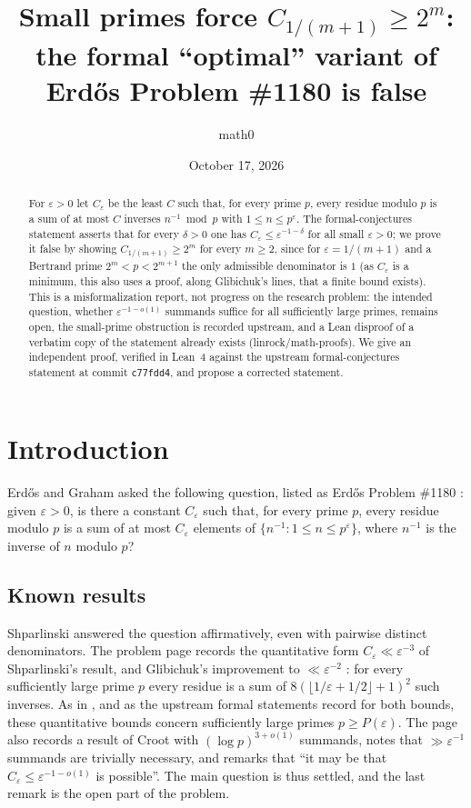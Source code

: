 \documentclass[11pt]{amsart}
\title[A defect in a formal statement of Erd\H{o}s Problem \#1180]{Small primes force $C_{1/(m+1)}\ge 2^m$: the formal ``optimal'' variant of Erd\H{o}s Problem \#1180 is false}
\author{math0}
\date{October 17, 2026}
\theoremstyle{plain}
\theoremstyle{definition}
\newcommand{\eps}{\varepsilon}
\begin{document}
\begin{abstract}
For $\eps>0$ let $C_\eps$ be the least $C$ such that, for every prime $p$, every residue modulo $p$ is a sum of at most $C$ inverses $n^{-1}\bmod p$ with $1\le n\le p^\eps$.
The formal-conjectures statement  asserts that for every $\delta>0$ one has $C_\eps\le\eps^{-1-\delta}$ for all small $\eps>0$; we prove it false by showing $C_{1/(m+1)}\ge2^m$ for every $m\ge2$, since for $\eps=1/(m+1)$ and a Bertrand prime $2^m<p<2^{m+1}$ the only admissible denominator is $1$ (as $C_\eps$ is a minimum, this also uses a proof, along Glibichuk's lines, that a finite bound exists).
This is a misformalization report, not progress on the research problem: the intended question, whether $\eps^{-1-o(1)}$ summands suffice for all sufficiently large primes, remains open, the small-prime obstruction is recorded upstream, and a Lean disproof of a verbatim copy of the statement already exists (linrock/math-proofs).
We give an independent proof, verified in Lean~4 against the upstream formal-conjectures statement at commit \texttt{c77fdd4}, and propose a corrected statement.
\end{abstract}
\maketitle

\section{Introduction}\label{sec:intro}

Erd\H{o}s and Graham \cite[p.~103]{ErGr80} asked the following question, listed as Erd\H{o}s Problem \#1180 \cite{EP1180}: given $\eps>0$, is there a constant $C_\eps$ such that, for every prime $p$, every residue modulo $p$ is a sum of at most $C_\eps$ elements of $\{n^{-1}:1\le n\le p^\eps\}$, where $n^{-1}$ is the inverse of $n$ modulo $p$?

\subsection*{Known results}
Shparlinski \cite{Sh02} answered the question affirmatively, even with pairwise distinct denominators.
The problem page \cite{EP1180} records the quantitative form $C_\eps\ll\eps^{-3}$ of Shparlinski's result, and Glibichuk's improvement to $\ll\eps^{-2}$ \cite{Gl06}: for every sufficiently large prime $p$ every residue is a sum of $8(\lfloor1/\eps+1/2\rfloor+1)^2$ such inverses.
As in \cite{Gl06}, and as the upstream formal statements record for both bounds, these quantitative bounds concern sufficiently large primes $p\ge P(\eps)$.
The page also records a result of Croot with $(\log p)^{3+o(1)}$ summands, notes that $\gg\eps^{-1}$ summands are trivially necessary, and remarks that ``it may be that $C_\eps\le\eps^{-1-o(1)}$ is possible''.
The main question is thus settled, and the last remark is the open part of the problem.
\end{document}
